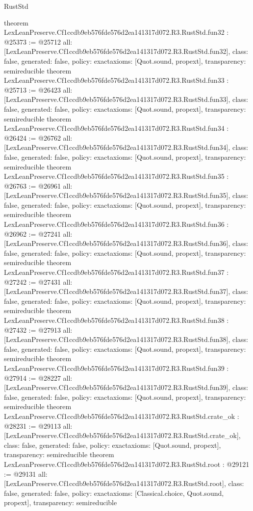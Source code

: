 \begin{lexlean}{RustStd}
\begin{coremodule}
{}
theorem LexLeanPreserve.Cf1ccdb9eb576fde576d2ea141317d072.R3.RustStd.fun32 : @25373 := @25712 {
  all: [LexLeanPreserve.Cf1ccdb9eb576fde576d2ea141317d072.R3.RustStd.fun32],
  class: false,
  generated: false,
  policy: exact{axioms: [Quot.sound, propext]},
  transparency: semireducible
}
theorem LexLeanPreserve.Cf1ccdb9eb576fde576d2ea141317d072.R3.RustStd.fun33 : @25713 := @26423 {
  all: [LexLeanPreserve.Cf1ccdb9eb576fde576d2ea141317d072.R3.RustStd.fun33],
  class: false,
  generated: false,
  policy: exact{axioms: [Quot.sound, propext]},
  transparency: semireducible
}
theorem LexLeanPreserve.Cf1ccdb9eb576fde576d2ea141317d072.R3.RustStd.fun34 : @26424 := @26762 {
  all: [LexLeanPreserve.Cf1ccdb9eb576fde576d2ea141317d072.R3.RustStd.fun34],
  class: false,
  generated: false,
  policy: exact{axioms: [Quot.sound, propext]},
  transparency: semireducible
}
theorem LexLeanPreserve.Cf1ccdb9eb576fde576d2ea141317d072.R3.RustStd.fun35 : @26763 := @26961 {
  all: [LexLeanPreserve.Cf1ccdb9eb576fde576d2ea141317d072.R3.RustStd.fun35],
  class: false,
  generated: false,
  policy: exact{axioms: [Quot.sound, propext]},
  transparency: semireducible
}
theorem LexLeanPreserve.Cf1ccdb9eb576fde576d2ea141317d072.R3.RustStd.fun36 : @26962 := @27241 {
  all: [LexLeanPreserve.Cf1ccdb9eb576fde576d2ea141317d072.R3.RustStd.fun36],
  class: false,
  generated: false,
  policy: exact{axioms: [Quot.sound, propext]},
  transparency: semireducible
}
theorem LexLeanPreserve.Cf1ccdb9eb576fde576d2ea141317d072.R3.RustStd.fun37 : @27242 := @27431 {
  all: [LexLeanPreserve.Cf1ccdb9eb576fde576d2ea141317d072.R3.RustStd.fun37],
  class: false,
  generated: false,
  policy: exact{axioms: [Quot.sound, propext]},
  transparency: semireducible
}
theorem LexLeanPreserve.Cf1ccdb9eb576fde576d2ea141317d072.R3.RustStd.fun38 : @27432 := @27913 {
  all: [LexLeanPreserve.Cf1ccdb9eb576fde576d2ea141317d072.R3.RustStd.fun38],
  class: false,
  generated: false,
  policy: exact{axioms: [Quot.sound, propext]},
  transparency: semireducible
}
theorem LexLeanPreserve.Cf1ccdb9eb576fde576d2ea141317d072.R3.RustStd.fun39 : @27914 := @28227 {
  all: [LexLeanPreserve.Cf1ccdb9eb576fde576d2ea141317d072.R3.RustStd.fun39],
  class: false,
  generated: false,
  policy: exact{axioms: [Quot.sound, propext]},
  transparency: semireducible
}
theorem LexLeanPreserve.Cf1ccdb9eb576fde576d2ea141317d072.R3.RustStd.crate_ok : @28231 := @29113 {
  all: [LexLeanPreserve.Cf1ccdb9eb576fde576d2ea141317d072.R3.RustStd.crate_ok],
  class: false,
  generated: false,
  policy: exact{axioms: [Quot.sound, propext]},
  transparency: semireducible
}
theorem LexLeanPreserve.Cf1ccdb9eb576fde576d2ea141317d072.R3.RustStd.root : @29121 := @29131 {
  all: [LexLeanPreserve.Cf1ccdb9eb576fde576d2ea141317d072.R3.RustStd.root],
  class: false,
  generated: false,
  policy: exact{axioms: [Classical.choice, Quot.sound, propext]},
  transparency: semireducible
}


\end{coremodule}
\end{lexlean}

